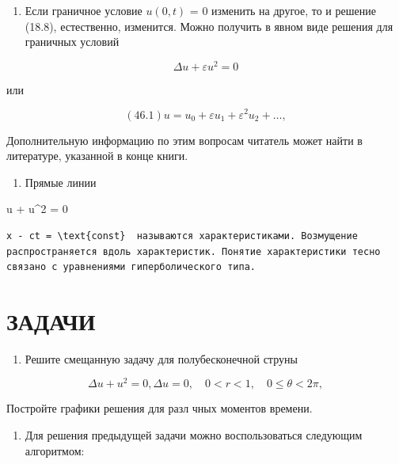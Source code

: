 \documentclass[
  ukrainian,
]{article}
\providecommand{\tightlist}{%
  \setlength{\itemsep}{0pt}\setlength{\parskip}{0pt}}
\begin{document}
\begin{enumerate}
\def\labelenumi{\arabic{enumi}.}
\setcounter{enumi}{1}
\tightlist
\item
  Если граничное условие \(u(0, t)\) = 0 изменить на другое, то и
  решение (18.8), естественно, изменится. Можно получить в явном виде
  решения для граничных условий
\end{enumerate}

\[
\Delta u + \varepsilon u^2 = 0
\]

или

\[
(46.1) u = u_0 + \varepsilon u_1 + \varepsilon^2 u_2 + \dots,
\]

Дополнительную информацию по этим вопросам читатель может найти в
литературе, указанной в конце книги.

\begin{enumerate}
\def\labelenumi{\arabic{enumi}.}
\setcounter{enumi}{2}
\tightlist
\item
  Прямые линии
\end{enumerate}

 u + u\^{}2 = 0

\begin{verbatim}
x - ct = \text{const}  называются характеристиками. Возмущение распространяется вдоль характеристик. Понятие характеристики тесно связано с уравнениями гиперболического типа.
\end{verbatim}

\section{ЗАДАЧИ}\label{ux437ux430ux434ux430ux447ux438-4}

\begin{enumerate}
\def\labelenumi{\arabic{enumi}.}
\tightlist
\item
  Решите смещанную задачу для полубесконечной струны
\end{enumerate}

\[
\Delta u + u^2 = 0,
\Delta u = 0, \quad 0 < r < 1, \quad 0 \le \theta < 2\pi,
\]

Постройте графики решения для разл чных моментов времени.

\begin{enumerate}
\def\labelenumi{\arabic{enumi}.}
\setcounter{enumi}{1}
\tightlist
\item
  Для решения предыдущей задачи можно воспользоваться следующим
  алгоритмом:
\end{enumerate}
\end{document}

